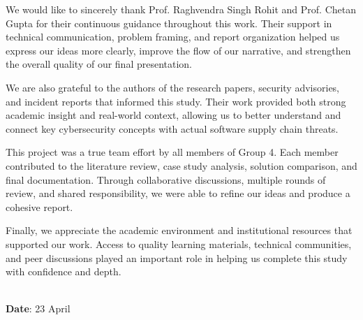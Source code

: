\begin{acknowledgements}
\addchaptertocentry{\acknowledgementname}

We would like to sincerely thank Prof. Raghvendra Singh Rohit and Prof. Chetan Gupta for their continuous guidance throughout this work. Their support in technical communication, problem framing, and report organization helped us express our ideas more clearly, improve the flow of our narrative, and strengthen the overall quality of our final presentation.

We are also grateful to the authors of the research papers, security advisories, and incident reports that informed this study. Their work provided both strong academic insight and real-world context, allowing us to better understand and connect key cybersecurity concepts with actual software supply chain threats.

This project was a true team effort by all members of Group 4. Each member contributed to the literature review, case study analysis, solution comparison, and final documentation. Through collaborative discussions, multiple rounds of review, and shared responsibility, we were able to refine our ideas and produce a cohesive report.

Finally, we appreciate the academic environment and institutional resources that supported our work. Access to quality learning materials, technical communities, and peer discussions played an important role in helping us complete this study with confidence and depth.

 \vspace{4cm}

\begin{minipage}[b]{0.5\textwidth}
	\begin{flushleft}
		~\\ {\bf Date}: 23 April
	\end{flushleft}
\end{minipage}
\begin{minipage}[b]{0.45\textwidth}
	\begin{flushright}
		~\\ \authorname
	 \end{flushright}
\end{minipage}

\end{acknowledgements}
